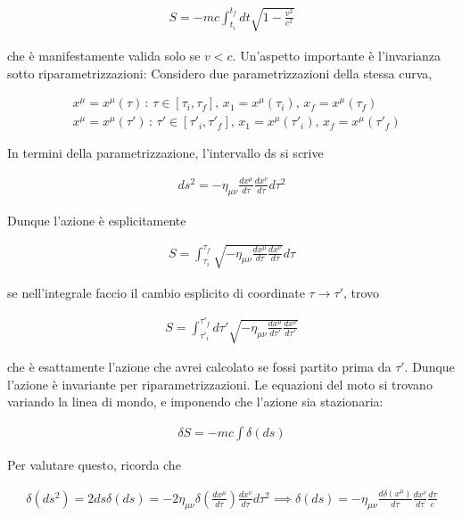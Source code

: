 \documentclass{report}
\begin{document}
\begin{align}
    S = -mc\int_{t_i}^{t_f}dt \sqrt{1 - \frac{v^2}{c^2}}
\end{align}

che è manifestamente valida solo se \(v < c\). Un'aspetto importante è l'invarianza sotto riparametrizzazioni: Considero due parametrizzazioni della stessa curva, 

\begin{align}
    &x^\mu = x^\mu(\tau) \, : \, \tau \in [\tau_i, \tau_f], \, x_1 = x^\mu(\tau_i), \, x_f = x^\mu(\tau_f)\\
    &x^\mu = x^\mu(\tau') \, : \, \tau' \in [\tau'_i, \tau'_f], \, x_1 = x^\mu(\tau'_i), \, x_f = x^\mu(\tau'_f)   
\end{align}

In termini della parametrizzazione, l'intervallo ds si scrive 

\begin{align}
    ds^2 = -\eta_{\mu\nu}\frac{dx^\mu}{d\tau}\frac{dx^\nu}{d\tau}d\tau^2
\end{align}

Dunque l'azione è esplicitamente 

\begin{align}
    S = \int_{\tau_i}^{\tau_f}\sqrt{-\eta_{\mu\nu}\frac{dx^\mu}{d\tau}\frac{dx^\nu}{d\tau}}d\tau
\end{align}

se nell'integrale faccio il cambio esplicito di coordinate \(\tau \rightarrow \tau'\), trovo 

\begin{align}
    S = \int_{\tau'_i}^{\tau'_f} d\tau' \sqrt{-\eta_{\mu\nu}\frac{dx^\mu}{d\tau'}\frac{dx^\nu}{d\tau'}}
\end{align}

che è esattamente l'azione che avrei calcolato se fossi partito prima da \(\tau'\). Dunque l'azione è invariante per riparametrizzazioni. Le equazioni del moto si trovano variando la linea di mondo, e imponendo che l'azione sia stazionaria: 


\begin{align}
    \delta S = -mc \int \delta(ds)
\end{align}

Per valutare questo, ricorda che 

\begin{align}
    \delta(ds^2) = 2ds\delta(ds) = -2\eta_{\mu\nu}\delta\left(\frac{dx^\mu}{d\tau}\right)\frac{dx^\nu}{d\tau}d\tau^2 \implies \delta(ds) = -\eta_{\mu\nu}\frac{d\delta(x^\mu)}{d\tau}\frac{dx^\nu}{d\tau}\frac{d\tau}{c}
\end{align}
\end{document}
